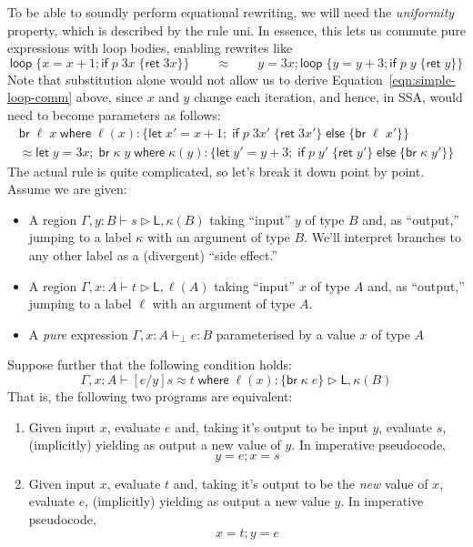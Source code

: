 \documentclass[acmsmall,screen,review]{acmart}
\newcommand{\ms}[1]{\ensuremath{\mathsf{#1}}}
\newcommand{\lto}{:}
\newcommand{\letexpr}[3]{\ensuremath{\ms{let}\;#1 = #2;\;#3}}
\newcommand{\brb}[2]{\ms{br}\;#1\;#2}
\newcommand{\where}[2]{#1\;\ms{where}\;#2}
\newcommand{\wbranch}[3]{#1(#2) \lto \{#3\}}
\newcommand{\bhyp}[2]{#1 : #2}
\newcommand{\hasty}[4]{#1 \vdash_{#2} #3: {#4}}
\newcommand{\haslb}[3]{#1 \vdash #2 \rhd #3}
\newcommand{\teqv}{\approx}
\newcommand{\lbeq}[4]{#1 \vdash #2 \teqv #3 \rhd {#4}}
\newcommand{\brle}[1]{{\textsf{#1}}}
\begin{document}
To be able to soundly perform equational rewriting, we will need the \emph{uniformity} property,
which is described by the rule \brle{uni}. In essence, this lets us commute pure expressions with
loop bodies, enabling rewrites like
\begin{equation}
  \ms{loop}\;\{ x = x + 1; \ms{if}\;p\;3x\;\{\ms{ret}\;3x\} \}
  \qquad \teqv \qquad 
  y = 3x; \ms{loop}\;\{ y = y + 3; \ms{if}\;p\;y\;\{\ms{ret}\;y\} \}
  \label{eqn:simple-loop-comm} 
\end{equation}
Note that substitution alone would not allow us to derive Equation~\ref{eqn:simple-loop-comm} above,
since $x$ and $y$ change each iteration, and hence, in SSA, would need to become parameters as
follows:
\begin{multline}
  \where{\brb{\ell}{x}}{\wbranch{\ell}{x}
    {\letexpr{x'}{x + 1}{\ms{if}\;p\;3x'\;\{\ms{ret}\;3x'\}\;\ms{else}\;\{\brb{\ell}{x'}\}}}}
  \\ \teqv
  \where{\letexpr{y}{3x}{\brb{\kappa}{y}}}{\wbranch{\kappa}{y}
    {\letexpr{y'}{y + 3}{\ms{if}\;p\;y'\;\{\ms{ret}\;y'\}\;\ms{else}\;\{\brb{\kappa}{y'}\}}}}
\end{multline}
The actual rule is quite complicated, so let's break it down point by point. Assume we are given:
\begin{itemize}
  \item A region $\haslb{\Gamma, \bhyp{y}{B}}{s}{\ms{L}, \kappa(B)}$ taking ``input'' $y$ of type
    $B$ and, as ``output,'' jumping to a label $\kappa$ with an argument of type $B$. We'll
    interpret branches to any other label as a (divergent) ``side effect.''
  \item A region $\haslb{\Gamma, \bhyp{x}{A}}{t}{\ms{L}, \ell(A)}$ taking ``input'' $x$ of type
    $A$ and, as ``output,'' jumping to a label $\ell$ with an argument of type $A$.
  \item A \emph{pure} expression $\hasty{\Gamma, \bhyp{x}{A}}{\bot}{e}{B}$ parameterised by a value
    $x$ of type $A$
\end{itemize}
Suppose further that the following condition holds:
$$
  \lbeq{\Gamma, \bhyp{x}{A}}{[e/y]s}{\where{t}{\wbranch{\ell}{x}{\brb{\kappa}{e}}}}
    {\ms{L}, \kappa(B)}
$$
That is, the following two programs are equivalent:
\begin{enumerate}[label=(\alph*)]
  \item Given input $x$, evaluate $e$ and, taking it's output to be input $y$, evaluate $s$,
  (implicitly) yielding as output a new value of $y$. In imperative pseudocode,
  $$
    y = e; x = s
  $$
  \item Given input $x$, evaluate $t$ and, taking it's output to be the \emph{new} value of $x$,
  evaluate $e$, (implicitly) yielding as output a new value $y$. In imperative pseudocode,
  $$
    x = t; y = e
  $$
\end{enumerate}
\end{document}
